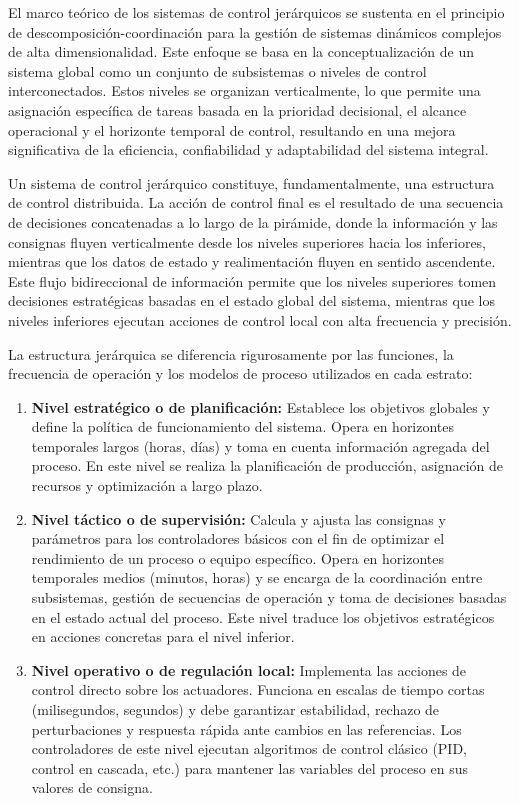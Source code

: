 El marco teórico de los sistemas de control jerárquicos se sustenta en el principio de descomposición-coordinación para la gestión de sistemas dinámicos complejos de alta dimensionalidad. Este enfoque se basa en la conceptualización de un sistema global como un conjunto de subsistemas o niveles de control interconectados. Estos niveles se organizan verticalmente, lo que permite una asignación específica de tareas basada en la prioridad decisional, el alcance operacional y el horizonte temporal de control, resultando en una mejora significativa de la eficiencia, confiabilidad y adaptabilidad del sistema integral.

Un sistema de control jerárquico constituye, fundamentalmente, una estructura de control distribuida. La acción de control final es el resultado de una secuencia de decisiones concatenadas a lo largo de la pirámide, donde la información y las consignas fluyen verticalmente desde los niveles superiores hacia los inferiores, mientras que los datos de estado y realimentación fluyen en sentido ascendente. Este flujo bidireccional de información permite que los niveles superiores tomen decisiones estratégicas basadas en el estado global del sistema, mientras que los niveles inferiores ejecutan acciones de control local con alta frecuencia y precisión.

La estructura jerárquica se diferencia rigurosamente por las funciones, la frecuencia de operación y los modelos de proceso utilizados en cada estrato:
\begin{enumerate}

\item \textbf{Nivel estratégico o de planificación:} Establece los objetivos globales y define la política de funcionamiento del sistema. Opera en horizontes temporales largos (horas, días) y toma en cuenta información agregada del proceso. En este nivel se realiza la planificación de producción, asignación de recursos y optimización a largo plazo.

\item \textbf{Nivel táctico o de supervisión:} Calcula y ajusta las consignas y parámetros para los controladores básicos con el fin de optimizar el rendimiento de un proceso o equipo específico. Opera en horizontes temporales medios (minutos, horas) y se encarga de la coordinación entre subsistemas, gestión de secuencias de operación y toma de decisiones basadas en el estado actual del proceso. Este nivel traduce los objetivos estratégicos en acciones concretas para el nivel inferior.

\item \textbf{Nivel operativo o de regulación local:} Implementa las acciones de control directo sobre los actuadores. Funciona en escalas de tiempo cortas (milisegundos, segundos) y debe garantizar estabilidad, rechazo de perturbaciones y respuesta rápida ante cambios en las referencias. Los controladores de este nivel ejecutan algoritmos de control clásico (PID, control en cascada, etc.) para mantener las variables del proceso en sus valores de consigna.

\end{enumerate}

